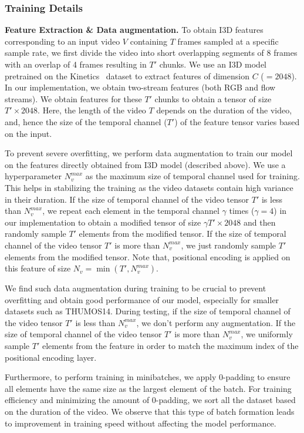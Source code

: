 \documentclass[10pt,twocolumn,letterpaper]{article}
\begin{document}
\subsubsection{Training Details}
\label{subsec:imp_tech}
\textbf{Feature Extraction \& Data augmentation.} To obtain I3D features corresponding to an input video $V$ containing $T$ frames sampled at a specific sample rate, we first divide the video into short overlapping segments of 8 frames with an overlap of 4 frames resulting in $T'$ chunks. We use an I3D model pretrained on the Kinetics~\cite{carreira2017quo} dataset to extract features of dimension $C$ ($=2048$). In our implementation, we obtain two-stream features (both RGB and flow streams). We obtain features for these $T'$ chunks to obtain a tensor of size $T' \times 2048$. Here, the length of the video $T$ depends on the duration of the video, and, hence the size of the temporal channel (\ie $T'$) of the feature tensor varies based on the input.

To prevent severe overfitting, we perform data augmentation to train our model on the features directly obtained from I3D model (described above). We use a hyperparameter $N_{v}^{max}$ as the maximum size of temporal channel used for training. This helps in stabilizing the training as the video datasets contain high variance in their duration. If the size of temporal channel of the video tensor $T'$ is less than $N_{v}^{max}$, we repeat each element in the temporal channel $\gamma$ times ($\gamma=4$) in our implementation to obtain a modified tensor of size $\gamma T' \times 2048$ and then randomly sample $T'$ elements from the modified tensor. If the size of temporal channel of the video tensor $T'$ is more than $N_{v}^{max}$, we just randomly sample $T'$ elements from the modified tensor. Note that, positional encoding is applied on this feature of size $N_v = \min(T',N_{v}^{max})$.

 We find such data augmentation during training to be crucial to prevent overfitting and obtain good performance of our model, especially for smaller datasets such as THUMOS14. 
During testing, if the size of temporal channel of the video tensor $T'$ is less than $N_{v}^{max}$, we don't perform any augmentation. If the size of temporal channel of the video tensor $T'$ is more than $N_{v}^{max}$, we uniformly sample $T'$ elements from the feature in order to match the maximum index of the positional encoding layer.

Furthermore, to perform training in minibatches, we apply $0$-padding to ensure all elements have the same size as the largest element of the batch. For training efficiency and minimizing the amount of $0$-padding, we sort all the dataset 
based on the duration of the video. We observe that this type of batch formation leads to improvement in training speed without affecting the model performance.
\end{document}
